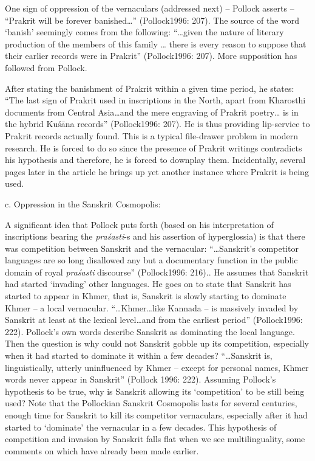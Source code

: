 One sign of oppression of the vernaculars (addressed next) – Pollock asserts – “Prakrit will be forever banished…” (Pollock1996: 207). The source of the word ‘banish’ seemingly comes from the following: “…given the nature of literary production of the members of this family … there is every reason to suppose that their earlier records were in Prakrit” (Pollock1996: 207). More supposition has followed from Pollock.

After stating the banishment of Prakrit within a given time period, he states: “The last sign of Prakrit used in inscriptions in the North, apart from Kharosthi documents from Central Asia…and the mere engraving of Prakrit poetry… is in the hybrid Kuśāna records” (Pollock1996: 207). He is thus providing lip-service to Prakrit records actually found. This is a typical file-drawer problem in modern research. He is forced to do so since the presence of Prakrit writings contradicts his hypothesis and therefore, he is forced to downplay them. Incidentally, several pages later in the article he brings up yet another instance where Prakrit is being used.


c. Oppression in the Sanskrit Cosmopolis:

A significant idea that Pollock puts forth (based on his interpretation of inscriptions bearing the \textit{praśasti}-s and his assertion of hyperglossia) is that there was competition between Sanskrit and the vernacular: “…Sanskrit’s competitor languages are so long disallowed any but a documentary function in the public domain of royal \textit{praśasti} discourse” (Pollock1996: 216).. He assumes that Sanskrit had started ‘invading’ other languages. He goes on to state that Sanskrit has started to appear in Khmer, that is, Sanskrit is slowly starting to dominate Khmer – a local vernacular. “…Khmer…like Kannada – is massively invaded by Sanskrit at least at the lexical level…and from the earliest period” (Pollock1996: 222). Pollock’s own words describe Sanskrit as dominating the local language. Then the question is why could not Sanskrit gobble up its competition, especially when it had started to dominate it within a few decades? “…Sanskrit is, linguistically, utterly uninfluenced by Khmer – except for personal names, Khmer words never appear in Sanskrit” (Pollock 1996: 222). Assuming Pollock’s hypothesis to be true, why is Sanskrit allowing its ‘competition’ to be still being used? Note that the Pollockian Sanskrit Cosmopolis lasts for several centuries, enough time for Sanskrit to kill its competitor vernaculars, especially after it had started to ‘dominate’ the vernacular in a few decades. This hypothesis of competition and invasion by Sanskrit falls flat when we see multilinguality, some comments on which have already been made earlier.

